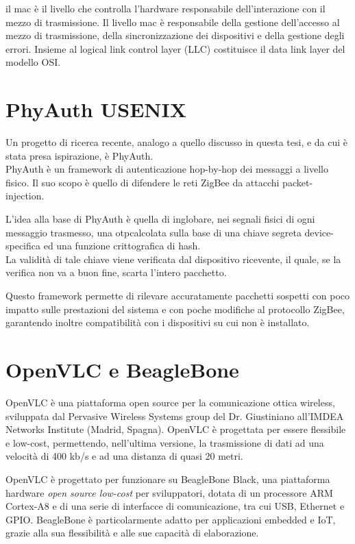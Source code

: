 il \gls{mac} è il livello che controlla l'hardware responsabile dell'interazione con il mezzo di trasmissione. Il livello \gls{mac} è responsabile della gestione dell'accesso al mezzo di trasmissione, della sincronizzazione dei dispositivi e della gestione degli errori. Insieme al logical link control layer (LLC) costituisce il data link layer del modello OSI.

\section{PhyAuth USENIX}
Un progetto di ricerca recente, analogo a quello discusso in questa tesi, e da cui è stata presa ispirazione, è PhyAuth.\\
PhyAuth è un framework di autenticazione hop-by-hop dei messaggi a livello fisico. Il suo scopo è quello di difendere le reti ZigBee da attacchi packet-injection.

L'idea alla base di PhyAuth è quella di inglobare, nei segnali fisici di ogni messaggio trasmesso, una \gls{otp}\glsfirstoccur calcolata sulla base di una chiave segreta device-specifica ed una funzione crittografica di hash.\\
La validità di tale chiave viene verificata dal dispositivo ricevente, il quale, se la verifica non va a buon fine, scarta l'intero pacchetto.

Questo framework permette di rilevare accuratamente pacchetti sospetti con poco impatto sulle prestazioni del sistema e con poche modifiche al protocollo ZigBee, garantendo inoltre compatibilità con i dispositivi su cui non è installato.

\section{OpenVLC e BeagleBone}
OpenVLC è una piattaforma open source per la comunicazione ottica wireless, sviluppata dal Pervasive Wireless Systems group del Dr. Giustiniano all'IMDEA Networks Institute (Madrid, Spagna).
OpenVLC è progettata per essere flessibile e low-cost, permettendo, nell'ultima versione, la trasmissione di dati ad una velocità di 400 kb/s e ad una distanza di quasi 20 metri.

OpenVLC è progettato per funzionare su BeagleBone Black, una piattaforma hardware \textit{open source low-cost} per sviluppatori, dotata di un processore ARM Cortex-A8 e di una serie di interfacce di comunicazione, tra cui USB, Ethernet e GPIO. BeagleBone è particolarmente adatto per applicazioni embedded e IoT, grazie alla sua flessibilità e alle sue capacità di elaborazione.
